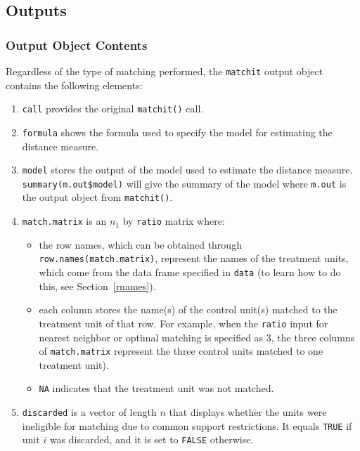 \documentclass[oneside,letterpaper,titlepage]{article}
\begin{document}

\subsection{Outputs}
\label{subsec:outputs}

\subsubsection{Output Object Contents}

Regardless of the type of matching performed, the \texttt{matchit}
output object contains the following elements:

\begin{enumerate}
\item \texttt{call} provides the original {\tt matchit()} call.
  
\item \texttt{formula} shows the formula used to specify the model for
  estimating the distance measure.
  
\item \texttt{model} stores the output of the model used to estimate
  the distance measure.  \texttt{summary(m.out\$model)} will give the
  summary of the model where \texttt{m.out} is the output object from
  \texttt{matchit()}.
  
\item \texttt{match.matrix} is an $n_1$ by \texttt{ratio} matrix
  where:
  \begin{itemize}
  \item the row names, which can be obtained through
    \texttt{row.names(match.matrix)}, represent the names of the
    treatment units, which come from the data frame specified in
    \texttt{data} (to learn how to do this, see Section~\ref{rnames}).
  \item each column stores the name(s) of the control unit(s) matched
    to the treatment unit of that row. For example, when the
    \texttt{ratio} input for nearest neighbor or optimal matching is
    specified as 3, the three columns of \texttt{match.matrix}
    represent the three control units matched to one treatment unit).
  \item \texttt{NA} indicates that the treatment unit was not matched.
  \end{itemize}
   
\item \texttt{discarded} is a vector of length $n$ that displays
  whether the units were ineligible for matching due to common support
  restrictions.  It equals \texttt{TRUE} if unit $i$ was discarded,
  and it is set to \texttt{FALSE} otherwise.
  

\end{enumerate}
\end{document}

